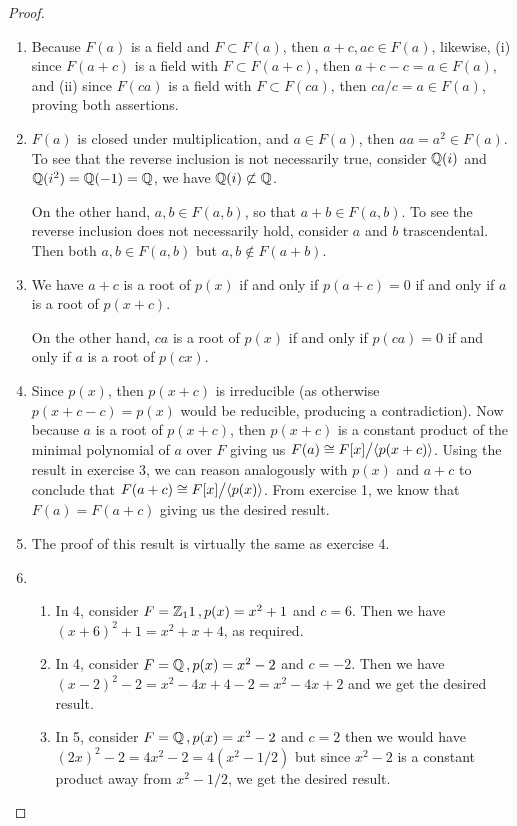 \begin{proof}
 \begin{enumerate}
     \item  Because $F(a)$ is a field and $F\subset F(a)$, then $a+c,ac\in F(a)$, likewise, (i) since $F(a+c)$ is a field with $F\subset F(a+c)$, then $a+c-c=a\in F(a)$, and (ii) since $F(ca)$ is a field with $F\subset F(ca)$, then $ca/c=a\in F(a)$, proving both assertions.
     \item $F(a)$ is closed under multiplication, and $a\in F(a)$, then $aa=a^2\in F(a)$. To see that the reverse inclusion is not necessarily true, consider $\mathbb{Q}(i)$ and $\mathbb{Q}(i^2)=\mathbb{Q}(-1)=\mathbb{Q}$, we have $\mathbb{Q}(i)\not\subset\mathbb{Q}$.
     
     On the other hand, $a,b\in F(a,b)$, so that $a+b\in F(a,b)$. To see the reverse inclusion does not necessarily hold, consider $a$ and $b$ trascendental. Then both $a,b\in F(a,b)$ but $a,b\notin F(a+b)$.
     \item We have $a+c$ is a root of $p(x)$ if and only if $p(a+c)=0$ if and only if $a$ is a root of $p(x+c)$.

     On the other hand, $ca$ is a root of $p(x)$ if and only if $p(ca)=0$ if and only if $a$ is a root of $p(cx)$.
    \item Since $p(x)$, then $p(x+c)$ is irreducible (as otherwise $p(x+c-c)=p(x)$ would be reducible, producing a contradiction). Now because $a$ is a root of $p(x+c)$, then $p(x+c)$ is a constant product of the minimal polynomial of $a$ over $F$ giving us $F(a)\cong{\textstyle F[x]}\big/{\textstyle \langle p(x+c)\rangle}$. Using the result in exercise 3, we can reason analogously with $p(x)$ and $a+c$ to conclude that $F(a+c)\cong{\textstyle F[x]}\big/{\textstyle \langle p(x)\rangle}$. From exercise 1, we know that $F(a)=F(a+c)$ giving us the desired result.
    \item The proof of this result is virtually the same as exercise 4.
    \item
    \begin{enumerate}
        \item In 4, consider $F=\mathbb{Z}_11\,,p(x)=x^2+1$ and $c=6$. Then we have $(x+6)^2+1=x^2+x+4$, as required.
        \item In 4, consider $F=\mathbb{Q}\,,p(x)=x^2-2$ and $c=-2$. Then we have $(x-2)^2-2=x^2-4x+4-2=x^2-4x+2$ and we get the desired result.
        \item In 5, consider $F=\mathbb{Q}\,,p(x)=x^2-2$ and $c=2$ then we would have $(2x)^2-2=4x^2-2=4(x^2-1/2)$ but since $x^2-2$ is a constant product away from $x^2-1/2$, we get the desired result.
    \end{enumerate}
 \end{enumerate}
\end{proof}

